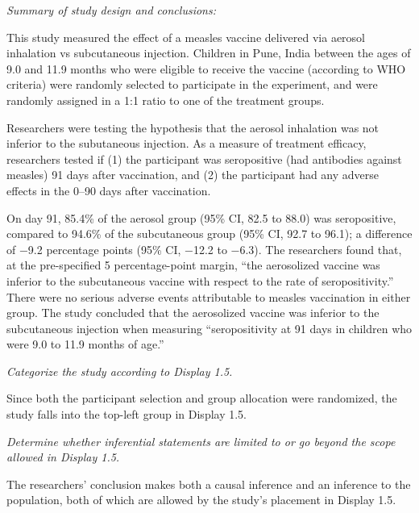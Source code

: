 \documentclass[11pt]{exam} %
\begin{document}
\begin{questions}
\begin{parts}
\begin{subparts}
\normalsize

\subpart \textit{Summary of study design and conclusions:}

This study measured the effect of a measles vaccine delivered via aerosol inhalation vs subcutaneous injection. Children in Pune, India between the ages of 9.0 and 11.9 months who were eligible to receive the vaccine (according to WHO criteria) were randomly selected to participate in the experiment, and were randomly assigned in a 1:1 ratio to one of the treatment groups.

Researchers were testing the hypothesis that the aerosol inhalation was not inferior to the subutaneous injection. As a measure of treatment efficacy, researchers tested if (1) the participant was seropositive (had antibodies against measles) 91 days after vaccination, and (2) the participant had any adverse effects in the 0--90 days after vaccination.

On day 91, 85.4\% of the aerosol group (95\% CI, 82.5 to 88.0) was seropositive, compared to 94.6\% of the subcutaneous group (95\% CI, 92.7 to 96.1); a difference of −9.2 percentage points (95\% CI, −12.2 to −6.3). The researchers found that, at the pre-specified 5 percentage-point margin, ``the aerosolized vaccine was inferior to the subcutaneous vaccine with respect to the rate of seropositivity.'' There were no serious adverse events attributable to measles vaccination in either group. The study concluded that the aerosolized vaccine was inferior to the subcutaneous injection when measuring ``seropositivity at 91 days in children who were 9.0 to 11.9 months of age.''


\subpart \textit{Categorize the study according to Display 1.5.}

Since both the participant selection and group allocation were randomized, the study falls into the top-left group in Display 1.5.

\subpart \textit{Determine whether inferential statements are limited to or go beyond the scope allowed in Display 1.5.}

The researchers' conclusion makes both a causal inference and an inference to the population, both of which are allowed by the study's placement in Display 1.5.

\end{subparts}




\end{parts}





\end{questions}
\end{document}
